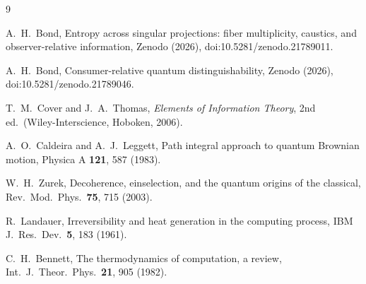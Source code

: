 \documentclass[aps,pre,reprint,nofootinbib]{revtex4-2}
\begin{document}
\begin{thebibliography}{9}

A.~H.~Bond,
Entropy across singular projections: fiber multiplicity, caustics, and
observer-relative information,
Zenodo (2026), doi:10.5281/zenodo.21789011.

A.~H.~Bond,
Consumer-relative quantum distinguishability,
Zenodo (2026), doi:10.5281/zenodo.21789046.

T.~M.~Cover and J.~A.~Thomas,
\emph{Elements of Information Theory}, 2nd ed.\
(Wiley-Interscience, Hoboken, 2006).

A.~O.~Caldeira and A.~J.~Leggett,
Path integral approach to quantum Brownian motion,
Physica A \textbf{121}, 587 (1983).

W.~H.~Zurek,
Decoherence, einselection, and the quantum origins of the classical,
Rev.\ Mod.\ Phys.\ \textbf{75}, 715 (2003).

R.~Landauer,
Irreversibility and heat generation in the computing process,
IBM J.\ Res.\ Dev.\ \textbf{5}, 183 (1961).

C.~H.~Bennett,
The thermodynamics of computation, a review,
Int.\ J.\ Theor.\ Phys.\ \textbf{21}, 905 (1982).

\end{thebibliography}
\end{document}
